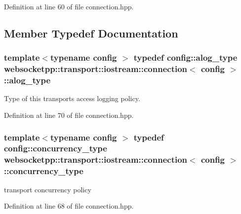Definition at line 60 of file connection.\+hpp.



\subsection{Member Typedef Documentation}
\hypertarget{classwebsocketpp_1_1transport_1_1iostream_1_1connection_a0bd2807136340e5af69325f3163fb79b}{}
\subsubsection[{alog\+\_\+type}]{\setlength{\rightskip}{0pt plus 5cm}template$<$typename config $>$ typedef config\+::alog\+\_\+type {\bf websocketpp\+::transport\+::iostream\+::connection}$<$ config $>$\+::{\bf alog\+\_\+type}}\label{classwebsocketpp_1_1transport_1_1iostream_1_1connection_a0bd2807136340e5af69325f3163fb79b}


Type of this transport\textquotesingle{}s access logging policy. 



Definition at line 70 of file connection.\+hpp.

\hypertarget{classwebsocketpp_1_1transport_1_1iostream_1_1connection_a761ef845f61222a2e7ad436610ac8cfc}{}
\subsubsection[{concurrency\+\_\+type}]{\setlength{\rightskip}{0pt plus 5cm}template$<$typename config $>$ typedef config\+::concurrency\+\_\+type {\bf websocketpp\+::transport\+::iostream\+::connection}$<$ config $>$\+::{\bf concurrency\+\_\+type}}\label{classwebsocketpp_1_1transport_1_1iostream_1_1connection_a761ef845f61222a2e7ad436610ac8cfc}


transport concurrency policy 



Definition at line 68 of file connection.\+hpp.

